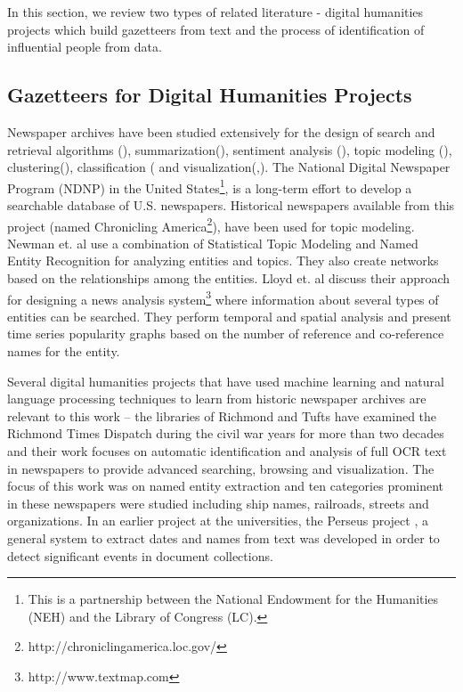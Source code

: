In this section, we review two types of related literature - digital humanities projects which build gazetteers from text and the process of identification of influential people from data.

\subsection{Gazetteers for Digital Humanities Projects}
Newspaper archives have been studied extensively for the design of search and retrieval algorithms (\cite{Shahaf_11, Gabrilovich_04a, Alonso_10, Khurdiya_11}), summarization(\cite{McKeown95, Otterbacher06, Radev97, Radev01, Radev05}), sentiment analysis (\cite{balahur2009rethinking, godbole2007large, li2014sentiment}), topic modeling (\cite{Masand_92, Nallapati_04a, Radev99c, au2011studying, lee2010topic}), clustering(\cite{dutta2011learning}), classification (\cite{dutta2012using} and visualization(\cite{torget2011mapping},\cite{southall2014pastplace}). The National Digital Newspaper Program (NDNP) in the United States\footnote{This is a partnership between the National Endowment for the Humanities (NEH) and the Library of Congress (LC).}, is a long-term effort to develop a searchable database of U.S. newspapers. Historical newspapers available from this project (named Chronicling America\footnote{http://chroniclingamerica.loc.gov/}), have been used for topic modeling\cite{yang2011topic}. Newman et. al\cite{newman2006analyzing} use a combination of Statistical Topic Modeling and Named Entity Recognition for analyzing entities and topics. They also create networks based on the relationships among the entities. Lloyd et. al \cite{lloyd2005lydia} discuss their approach for designing a news analysis system\footnote{http://www.textmap.com} where information about several types of entities can be searched. They perform temporal and spatial analysis and present time series popularity graphs based on the number of reference and co-reference names for the entity. %

Several digital humanities projects that have used machine learning and natural language processing techniques to learn from historic newspaper archives are relevant to this work -- the libraries of Richmond and Tufts have examined the Richmond Times Dispatch during the civil war years for more than two decades and their work focuses on automatic identification and analysis of full OCR text in newspapers to provide advanced searching, browsing and visualization\cite{crane2006challenge}. The focus of this work was on named entity extraction and ten categories prominent in these newspapers were studied including ship names, railroads, streets and organizations. In an earlier project at the universities, the Perseus project \cite{smith2002detectinga, smith2002detectingb, smith2001disambiguating}, a general system to extract dates and names from text was developed in order to detect significant events in document collections. 

